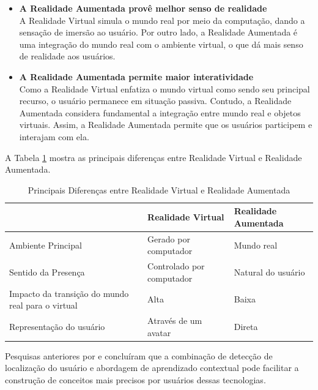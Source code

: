 \begin{itemize}
    \item \textbf{A Realidade Aumentada provê melhor senso de realidade}\\
    
    A Realidade Virtual simula o mundo real por meio da computação, dando a
    sensação de imersão ao usuário. Por outro lado, a Realidade Aumentada 
    é uma integração do mundo real com o ambiente virtual, o que dá mais senso
    de realidade aos usuários.
    
    \item \textbf{A Realidade Aumentada permite maior interatividade}\\
    
    Como a Realidade Virtual enfatiza o mundo virtual como sendo seu principal
    recurso, o usuário permanece em situação passiva. Contudo, a Realidade Aumentada
    considera fundamental a integração entre mundo real e objetos virtuais. Assim,
    a Realidade Aumentada permite que os usuários participem e interajam com ela.
\end{itemize}

A Tabela \ref{tab:dif_AR_VR} mostra as principais diferenças entre
Realidade Virtual e Realidade Aumentada.

\begin{table}[h!]
    \centering
    \caption{Principais Diferenças entre Realidade Virtual e Realidade Aumentada}
    \label{tab:dif_AR_VR}
    \begin{tabular}{| p{5cm} | p{5cm} | p{5cm} |}
         \hline
         & Realidade Virtual & Realidade Aumentada \\
         \hline
         Ambiente Principal & Gerado por computador & Mundo real \\
         \hline
         Sentido da Presença & Controlado por computador & Natural do usuário \\
         \hline
         Impacto da transição do mundo real para o virtual & Alta & Baixa \\
         \hline
         Representação do usuário & Através de um avatar & Direta \\
         \hline
    \end{tabular}
\end{table}

Pesquisas anteriores por \cite{AppsHandheldDevices} e \cite{FieldTrips}
concluíram que a combinação de detecção de localização do usuário e
abordagem de aprendizado contextual pode facilitar a construção de 
conceitos mais precisos por usuários dessas tecnologias.

